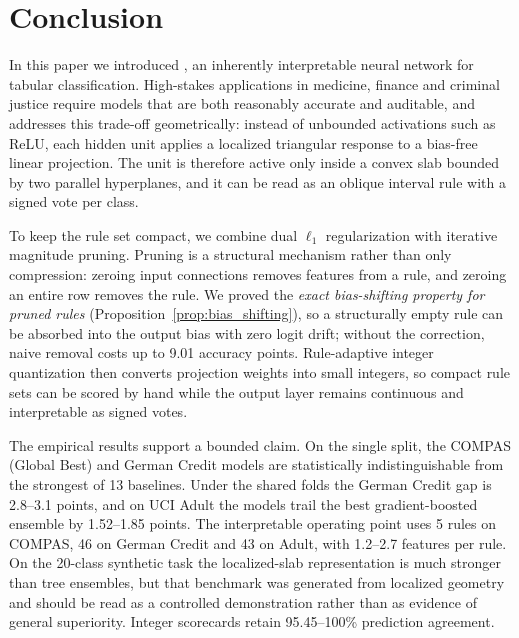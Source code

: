 \section{Conclusion}
\label{sec:conclusion}

In this paper we introduced \modelname{}, an inherently interpretable neural
network for tabular classification. High-stakes applications in medicine, finance
and criminal justice require models that are both reasonably accurate and
auditable, and \modelname{} addresses this trade-off geometrically: instead of
unbounded activations such as ReLU, each hidden unit applies a localized
triangular response to a bias-free linear projection. The unit is therefore active
only inside a convex slab bounded by two parallel hyperplanes, and it can be read
as an oblique interval rule with a signed vote per class.

To keep the rule set compact, we combine dual $\ell_1$ regularization with
iterative magnitude pruning. Pruning is a structural mechanism rather than only
compression: zeroing input connections removes features from a rule, and zeroing
an entire row removes the rule. We proved the \emph{exact bias-shifting property
for pruned rules} (Proposition~\ref{prop:bias_shifting}), so a structurally empty
rule can be absorbed into the output bias with zero logit drift; without the
correction, naive removal costs up to 9.01 accuracy points. Rule-adaptive integer
quantization then converts projection weights into small integers, so compact rule
sets can be scored by hand while the output layer remains continuous and
interpretable as signed votes.

The empirical results support a bounded claim. On the single split, the COMPAS
(Global Best) and German Credit models are statistically indistinguishable from
the strongest of 13 baselines. Under the shared folds the German Credit gap is
2.8--3.1 points, and on UCI Adult the models trail the best gradient-boosted
ensemble by 1.52--1.85 points. The interpretable operating point uses 5 rules on
COMPAS, 46 on German Credit and 43 on Adult, with 1.2--2.7 features per rule. On
the 20-class synthetic task the localized-slab representation is much stronger
than tree ensembles, but that benchmark was generated from localized geometry and
should be read as a controlled demonstration rather than as evidence of general
superiority. Integer scorecards retain 95.45--100\% prediction agreement.

